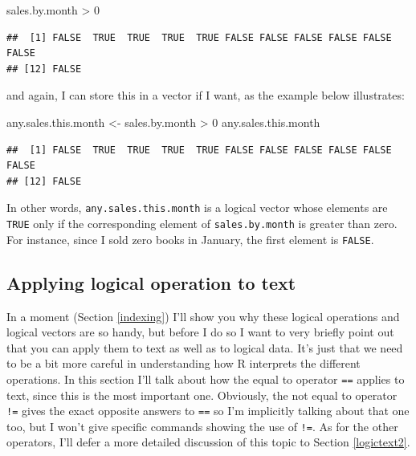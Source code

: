 \documentclass[
]{book}
\newenvironment{Shaded}{\begin{snugshade}}{\end{snugshade}}
\newcommand{\DecValTok}[1]{\textcolor[rgb]{0.00,0.00,0.81}{#1}}
\newcommand{\NormalTok}[1]{#1}
\newcommand{\OtherTok}[1]{\textcolor[rgb]{0.56,0.35,0.01}{#1}}
\newcommand{\SpecialCharTok}[1]{\textcolor[rgb]{0.00,0.00,0.00}{#1}}
\begin{document}
\begin{Shaded}
\begin{Highlighting}[]
\NormalTok{sales.by.month }\SpecialCharTok{\textgreater{}} \DecValTok{0}
\end{Highlighting}
\end{Shaded}

\begin{verbatim}
##  [1] FALSE  TRUE  TRUE  TRUE  TRUE FALSE FALSE FALSE FALSE FALSE FALSE
## [12] FALSE
\end{verbatim}

and again, I can store this in a vector if I want, as the example below illustrates:

\begin{Shaded}
\begin{Highlighting}[]
\NormalTok{any.sales.this.month }\OtherTok{\textless{}{-}}\NormalTok{ sales.by.month }\SpecialCharTok{\textgreater{}} \DecValTok{0}
\NormalTok{any.sales.this.month}
\end{Highlighting}
\end{Shaded}

\begin{verbatim}
##  [1] FALSE  TRUE  TRUE  TRUE  TRUE FALSE FALSE FALSE FALSE FALSE FALSE
## [12] FALSE
\end{verbatim}

In other words, \texttt{any.sales.this.month} is a logical vector whose elements are \texttt{TRUE} only if the corresponding element of \texttt{sales.by.month} is greater than zero. For instance, since I sold zero books in January, the first element is \texttt{FALSE}.

\hypertarget{logictext}{%
\subsection{Applying logical operation to text}\label{logictext}}

In a moment (Section \ref{indexing}) I'll show you why these logical operations and logical vectors are so handy, but before I do so I want to very briefly point out that you can apply them to text as well as to logical data. It's just that we need to be a bit more careful in understanding how R interprets the different operations. In this section I'll talk about how the equal to operator \texttt{==} applies to text, since this is the most important one. Obviously, the not equal to operator \texttt{!=} gives the exact opposite answers to \texttt{==} so I'm implicitly talking about that one too, but I won't give specific commands showing the use of \texttt{!=}. As for the other operators, I'll defer a more detailed discussion of this topic to Section \ref{logictext2}.
\end{document}
